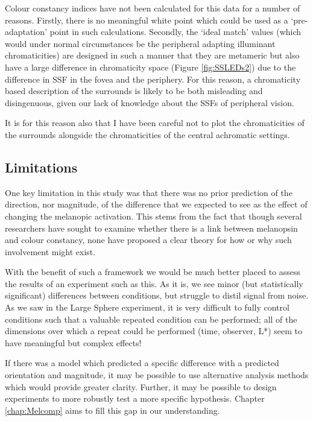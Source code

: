 Colour constancy indices have not been calculated for this data for a number of reasons. Firstly, there is no meaningful white point which could be used as a `pre-adaptation' point in such calculations. Secondly, the `ideal match' values (which would under normal circumstances be the peripheral adapting illuminant chromaticities) are designed in such a manner that they are metameric but also have a large difference in chromaticity space (Figure \ref{fig:SSLEDs2}) due to the difference in \gls{SSF} in the fovea and the periphery. For this reason, a chromaticity based description of the surrounds is likely to be both misleading and disingenuous, given our lack of knowledge about the \glspl{SSF} of peripheral vision. 

It is for this reason also that I have been careful not to plot the chromaticities of the surrounds alongside the chromaticities of the central achromatic settings. 

\subsection{Limitations}

One key limitation in this study was that there was no prior prediction of the direction, nor magnitude, of the difference that we expected to see as the effect of changing the melanopic activation. This stems from the fact that though several researchers have sought to examine whether there is a link between melanopsin and colour constancy, none have proposed a clear theory for how or why such involvement might exist.

With the benefit of such a framework we would be much better placed to assess the results of an experiment such as this. As it is, we see minor (but statistically significant) differences between conditions, but struggle to distil signal from noise. As we saw in the Large Sphere experiment, it is very difficult to fully control conditions such that a valuable repeated condition can be performed; all of the dimensions over which a repeat could be performed (time, observer, L*) seem to have meaningful but complex effects!

If there was a model which predicted a specific difference with a predicted orientation and magnitude, it may be possible to use alternative analysis methods which would provide greater clarity. Further, it may be possible to design experiments to more robustly test a more specific hypothesis. Chapter \ref{chap:Melcomp} aims to fill this gap in our understanding.

